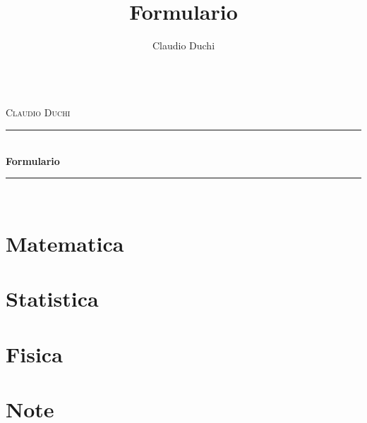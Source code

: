 \documentclass[openany]{book}%
\title{Formulario}
\author{Claudio Duchi}
\date{\datetime}
\makeatletter
\newcommand{\HRule}{\rule{\linewidth}{0.5mm}}
\renewcommand\frontmatter{%
	\cleardoublepage
	\@mainmatterfalse
}
\renewcommand\mainmatter{%
	\cleardoublepage
	\@mainmattertrue
}
\makeatother
\begin{document}
		\frontmatter
		\hypersetup{pageanchor=false}
		\begin{titlepage}
			\begin{center}
			\\[1cm]
				\textsc{\LARGE Claudio Duchi}\\[1.5cm]
				\HRule \\[0.4cm]
				{ \huge \bfseries Formulario}\\[0.4cm]
				\HRule \\[1.5cm]
				\vfill
			\end{center}
		\end{titlepage}
	\hypersetup{pageanchor=true}
		
		\tableofcontents
		\listoffigures
			\listoftables
			\mainmatter
\part{Matematica}			


	






	

	








	


















\part{Statistica}

\part{Fisica}


\part{Note}

\printindex
\end{document}
